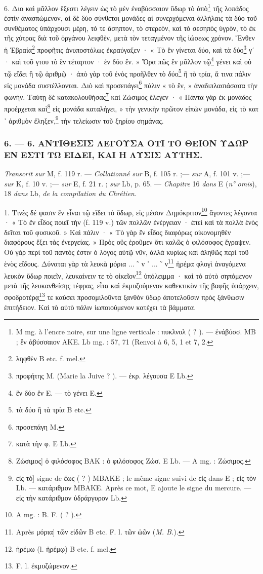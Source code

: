\documentclass[a4paper, 11pt, oneside, polutonikogreek, french]{article}
\begin{document}
6. Διο καὶ μᾶλλον ἔξεστι λέγειν ὡς τὸ μὲν ἐναβύσσαιον ὕδωρ τὸ ἀπὸ\footnote{M mg. à l'encre noire, sur une ligne verticale : πυκλνολ ( ? ). --- ἐνάβύσσ. MB ; ἓν ἀβύσσαιον AKE. Lb mg. : 57, 71 (Renvoi à 6, 5, 1 et 7, 2.} τῆς λοπάδος ἐστὶν ἀνασπώμενον, αἱ δὲ δύο σύνθετοι μονάδες αἱ συνερχόμεναι ἀλλήλαις τὰ δύο τοῦ συνθέματος ὑπάρχουσι μέρη, τό τε ἄσηπτον, τὸ στερεὸν, καὶ τὸ σεσηπὸς ὑγρὸν, τὸ ἐκ τῆς χύτρας διὰ τοῦ ὀργάνου λειφθὲν, μετὰ τὸν τεταγμένον τῆς ἰώσεως χρόνον. Ἔνθεν ἡ Ἑβραία\footnote{ληφθὲν B etc. f. mel.} προφῆτις ἀνυποστόλως ἐκραύγαξεν · « Τὸ ἓν γίνεται δύο, καὶ τὰ δύο\footnote{προφήτης M. (Marie la Juive ? ). --- ἐκρ. λέγουσα E Lb.} γʹ · καὶ τοῦ γτου τὸ ἓν τέταρτον · ἐν δύο ἕν. » Ὅρα πῶς ἓν μᾶλλον τῷ\footnote{ἓν δύο ἓν E. --- τὸ γένει E.} γένει καὶ οὐ τῷ εἴδει ἢ τῷ ἀριθμῷ · ἀπὸ γὰρ τοῦ ἑνὸς προῆλθεν τὸ δύο\footnote{τὰ δύο ἢ τὰ τρία B etc.} ἢ τὸ τρία, ἅ τινα πάλιν εἰς μονάδα συστέλλονται. Διὸ καὶ προσεπάγει\footnote{προσεπάγη M.} πάλιν « τὸ ἓν, » ἀναδιπλασιάσασα τὴν φωνήν. Ταύτῃ δὲ κατακολουθήσας\footnote{κατὰ τὴν φ. E Lb.} καὶ Ζώσιμος ἔλεγεν · « Πάντα γὰρ ἐκ μονάδος προέρχεται καὶ\footnote{Ζώσιμος] ὁ φιλόσοφος BAK : ὁ φιλόσοφος Ζώσ. E Lb. --- A mg. : Ζώσιμος.} εἰς μονάδα καταλήγει, » τὴν γενικὴν πρῶτον εἰπὼν μονάδα, εἰς τὸ κατ ᾽ ἀριθμὸν ἔληξεν,\footnote{εἰς τὸ] signe de ἕως ( ? ) MBAKE ; le même signe suivi de εἰς dans E ; εἰς τὸν Lb. --- κατάριθμον MBAKE. Après ce mot, E ajoute le signe du mercure. --- εἰς τὴν κατάριθμον ὑδράργυρον Lb.} τὴν τελείωσιν τοῦ ξηρίου σημάνας.

\bigskip
\centerline{\EightStarTaper}
\centerline{\EightStarTaper\EightStarTaper}
\bigskip

\subsubsection{6. --- 6. ΑΝΤΙΘΕΣΙΣ ΛΕΓΟΥΣΑ ΟΤΙ ΤΟ ΘΕΙΟΝ ΥΔΩΡ ΕΝ ΕΣΤΙ ΤΩ ΕΙΔΕΙ, ΚΑΙ Η ΛΥΣΙΣ ΑΥΤΗΣ.}

\emph{Transcrit sur} M, f. 119 r. --- \emph{Collationné sur} B, f. 105 r. ;--- \emph{sur} A, f. 101 v. ;--- \emph{sur} K, f. 10 v. ;--- \emph{sur} E, f. 21 r. ; \emph{sur} Lb, p. 65. --- \emph{Chapitre} 16 \emph{dans} E (\emph{n° omis}), 18 \emph{dans} Lb, \emph{de la compilation du Chrétien.}

\bigskip

1. Τινὲς δέ φασιν ἓν εἶναι τῷ εἴδει τὸ ὕδωρ, εἰς μέσον Δημόκριτον\footnote{A mg. : B. F. ( ? ).} ἄγοντες λέγοντα · « Τὸ ἓν εἶδος ποιεῖ τὴν (f. 119 v.) τῶν πολλῶν ἐνέργειαν · ἐπεὶ καὶ τὰ πολλὰ ἑνὸς δεῖται τοῦ φυσικοῦ. » Καὶ πάλιν · « Τὸ γὰρ ἓν εἶδος διαφόρως οἰκονομηθὲν διαφόρους ἕξει τὰς ἐνεργείας. » Πρὸς οὓς ἐροῦμεν ὅτι καλῶς ὁ φιλόσοφος ἔγραψεν. Οὐ γὰρ περὶ τοῦ παντός ἐστιν ὁ λόγος αὐτῷ νῦν, ἀλλὰ κυρίως καὶ ἀληθῶς περὶ τοῦ ἑνὸς εἴδους. Δύναται γὰρ τὰ λευκὰ μόρια ... ῀ ν ᾽ ... ῀ ν\footnote{Après μόρια] τῶν εἰδῶν B etc. F. l. τῶν ὠῶν (\emph{M. B.}).} ἠρέμα φλογὶ ἀναγόμενα λευκὸν ὕδωρ ποιεῖν, λευκαίνειν τε τὸ οἰκεῖον\footnote{ἠρέμω (l. ἠρέμῳ) B etc. f. mel.} ὑπόλειμμα · καὶ τὸ αὐτὸ σηπόμενον μετὰ τῆς λευκανθείσης τέφρας, εἶτα καὶ ἐκμυζούμενον καθεκτικὸν τῆς βαφῆς ὑπάρχειν, σφοδροτέρᾳ\footnote{F. l. ἐκμυζώμενον.} τε καύσει προσομιλοῦντα ξανθὸν ὕδωρ ἀποτελοῦσιν πρὸς ξάνθωσιν ἐπιτήδειον. Καὶ τὸ αὐτὸ πάλιν ἰωποιούμενον κατέχει τὰ βάμματα.
\end{document}
